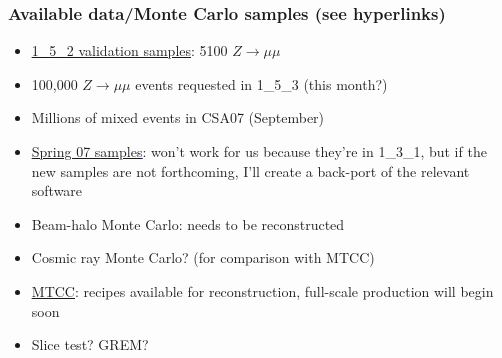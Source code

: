 \documentclass[compress]{beamer}
\begin{document}
\begin{frame}
\frametitle{Available data/Monte Carlo samples (see hyperlinks)}
\begin{itemize}\setlength{\itemsep}{0.25 cm}
\item \textcolor{blue}{\underline{\href{http://cmsdbs.cern.ch/DBS2_discovery/getData?ajax=0&userMode=user&dbsInst=cms_dbs_prod_global&group=Any&tier=Any&site=Any&app=CMSSW_1_5_2&primType=Any&primD=Any}{1\_5\_2 validation samples}}}: 5100 $Z\to\mu\mu$
\item 100,000 $Z\to\mu\mu$ events requested in 1\_5\_3 (this month?)
\item Millions of mixed events in CSA07 (September)
\item \textcolor{blue}{\underline{\href{https://twiki.cern.ch/twiki/bin/view/CMS/TkAlignmentMC}{Spring 07 samples}}}: won't work for us because they're in 1\_3\_1, but if the new samples are not forthcoming, I'll create a back-port of the relevant software
\item Beam-halo Monte Carlo: needs to be reconstructed
\item Cosmic ray Monte Carlo?  (for comparison with MTCC)
\item \textcolor{blue}{\underline{\href{https://twiki.cern.ch/twiki/bin/view/CMS/ReconMTCC2006}{MTCC}}}: recipes available for reconstruction, full-scale production will begin soon
\item Slice test?  GREM?
\end{itemize}
\label{numpages}
\end{frame}
\end{document}
